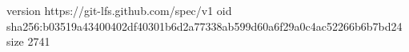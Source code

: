 version https://git-lfs.github.com/spec/v1
oid sha256:b03519a43400402df40301b6d2a77338ab599d60a6f29a0c4ac52266b6b7bd24
size 2741
